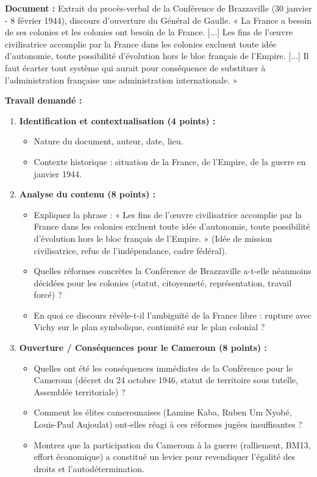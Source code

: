 \documentclass[11pt]{article}
\begin{document}
\begin{exercice}
\textbf{Document :} Extrait du procès-verbal de la Conférence de Brazzaville (30 janvier - 8 février 1944), discours d'ouverture du Général de Gaulle.
« La France a besoin de ses colonies et les colonies ont besoin de la France. [...] Les fins de l'œuvre civilisatrice accomplie par la France dans les colonies excluent toute idée d'autonomie, toute possibilité d'évolution hors le bloc français de l'Empire. [...] Il faut écarter tout système qui aurait pour conséquence de substituer à l'administration française une administration internationale. »

\textbf{Travail demandé :}
\begin{enumerate}
\item \textbf{Identification et contextualisation (4 points) :}
\begin{itemize}
\item[a.] Nature du document, auteur, date, lieu.
\item[b.] Contexte historique : situation de la France, de l'Empire, de la guerre en janvier 1944.
\end{itemize}
\item \textbf{Analyse du contenu (8 points) :}
\begin{itemize}
\item[a.] Expliquez la phrase : « Les fins de l'œuvre civilisatrice accomplie par la France dans les colonies excluent toute idée d'autonomie, toute possibilité d'évolution hors le bloc français de l'Empire. » (Idée de mission civilisatrice, refus de l'indépendance, cadre fédéral).
\item[b.] Quelles réformes concrètes la Conférence de Brazzaville a-t-elle néanmoins décidées pour les colonies (statut, citoyenneté, représentation, travail forcé) ?
\item[c.] En quoi ce discours révèle-t-il l'ambiguïté de la France libre : rupture avec Vichy sur le plan symbolique, continuité sur le plan colonial ?
\end{itemize}
\item \textbf{Ouverture / Conséquences pour le Cameroun (8 points) :}
\begin{itemize}
\item[a.] Quelles ont été les conséquences immédiates de la Conférence pour le Cameroun (décret du 24 octobre 1946, statut de territoire sous tutelle, Assemblée territoriale) ?
\item[b.] Comment les élites camerounaises (Lamine Kaba, Ruben Um Nyobé, Louis-Paul Aujoulat) ont-elles réagi à ces réformes jugées insuffisantes ?
\item[c.] Montrez que la participation du Cameroun à la guerre (ralliement, BM13, effort économique) a constitué un levier pour revendiquer l'égalité des droits et l'autodétermination.
\end{itemize}
\end{enumerate}
\end{exercice}
\end{document}
